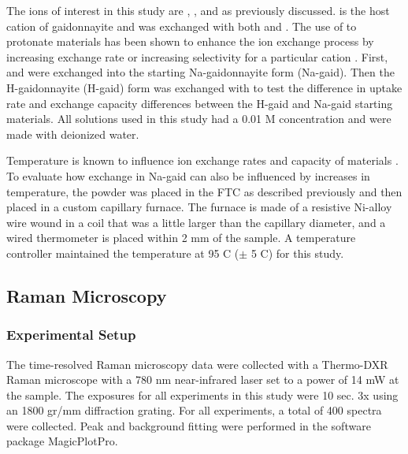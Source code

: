 \documentclass[journal=acsodf,manuscript=article]{achemso}
\begin{document}
The ions of interest in this study are ,
, and  as previously
discussed.   is the host cation of gaidonnayite and
was exchanged with both  and .
The use of  to protonate materials has been shown to
enhance the ion exchange process by increasing exchange rate or
increasing selectivity for a particular cation \cite{Clearfield_1988,Clearfield_2001,Celestian_2007,Tripathi_2003}. 
First,  and  were exchanged into the starting Na-gaidonnayite form
(Na-gaid).  Then the H-gaidonnayite (H-gaid) form was exchanged with
 to test the difference in uptake rate and exchange
capacity differences between the H-gaid and Na-gaid starting materials.
All solutions used in this study had a 0.01 M concentration and were
made with deionized water.



Temperature is known to influence ion exchange rates and capacity of
materials \cite{Helfferich1962}. To evaluate how 
exchange in Na-gaid can also be influenced by increases in temperature,
the powder was placed in the FTC as described previously and then placed
in a custom capillary furnace. The furnace is made of a resistive
Ni-alloy wire wound in a coil that was a little larger than the
capillary diameter, and a wired thermometer is placed within 2 mm of the sample.
A temperature controller maintained the temperature at 95 \degree C ($\pm$ 5 \degree C) for this study.



\subsection{Raman Microscopy}

{\label{methods_raman}}   %

\subsubsection{Experimental Setup}

{\label{methods_raman_setup}}  %

The time-resolved Raman microscopy data were collected with a Thermo-DXR
Raman microscope with a 780 nm near-infrared laser set to a power of 14
mW at the sample. The exposures for all experiments in this study were
10 sec. 3x using an 1800 gr/mm diffraction grating. For all experiments,
a total of 400 spectra were collected. Peak and background fitting were
performed in the software package MagicPlotPro.
\end{document}

